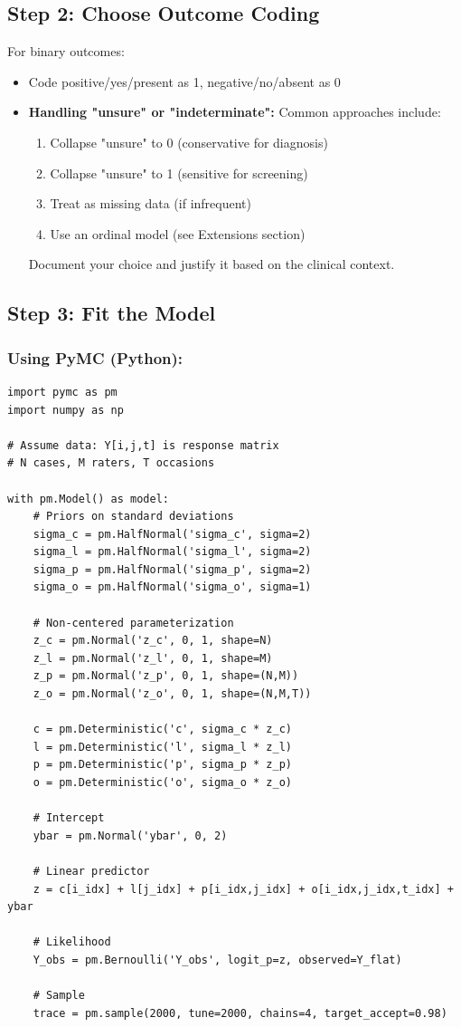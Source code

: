 \documentclass[num-refs]{wiley-article}
\begin{document}
\subsection*{Step 2: Choose Outcome Coding}

For binary outcomes:
\begin{itemize}
    \item Code positive/yes/present as 1, negative/no/absent as 0
    \item \textbf{Handling "unsure" or "indeterminate":} Common approaches include:
    \begin{enumerate}
        \item Collapse "unsure" to 0 (conservative for diagnosis)
        \item Collapse "unsure" to 1 (sensitive for screening)
        \item Treat as missing data (if infrequent)
        \item Use an ordinal model (see Extensions section)
    \end{enumerate}
    Document your choice and justify it based on the clinical context.
\end{itemize}

\subsection*{Step 3: Fit the Model}

\subsubsection*{Using PyMC (Python):}
\begin{verbatim}
import pymc as pm
import numpy as np

# Assume data: Y[i,j,t] is response matrix
# N cases, M raters, T occasions

with pm.Model() as model:
    # Priors on standard deviations
    sigma_c = pm.HalfNormal('sigma_c', sigma=2)
    sigma_l = pm.HalfNormal('sigma_l', sigma=2)
    sigma_p = pm.HalfNormal('sigma_p', sigma=2)
    sigma_o = pm.HalfNormal('sigma_o', sigma=1)

    # Non-centered parameterization
    z_c = pm.Normal('z_c', 0, 1, shape=N)
    z_l = pm.Normal('z_l', 0, 1, shape=M)
    z_p = pm.Normal('z_p', 0, 1, shape=(N,M))
    z_o = pm.Normal('z_o', 0, 1, shape=(N,M,T))

    c = pm.Deterministic('c', sigma_c * z_c)
    l = pm.Deterministic('l', sigma_l * z_l)
    p = pm.Deterministic('p', sigma_p * z_p)
    o = pm.Deterministic('o', sigma_o * z_o)

    # Intercept
    ybar = pm.Normal('ybar', 0, 2)

    # Linear predictor
    z = c[i_idx] + l[j_idx] + p[i_idx,j_idx] + o[i_idx,j_idx,t_idx] + ybar

    # Likelihood
    Y_obs = pm.Bernoulli('Y_obs', logit_p=z, observed=Y_flat)

    # Sample
    trace = pm.sample(2000, tune=2000, chains=4, target_accept=0.98)
\end{verbatim}
\end{document}
